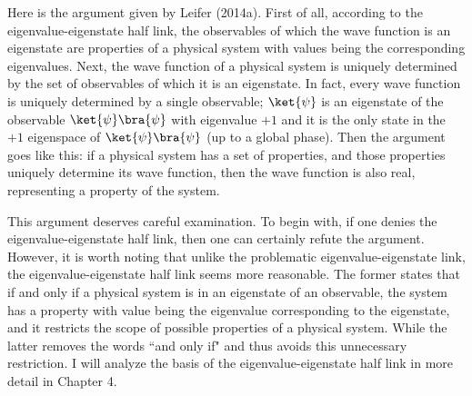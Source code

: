Here is the argument given by Leifer (2014a). First of all, according to the eigenvalue-eigenstate half link, the observables of which the wave function is an eigenstate are properties of a physical system with values being the corresponding eigenvalues. Next, the wave function of a physical system is uniquely determined by the set of observables of which it is an eigenstate. In fact, every wave function is uniquely determined by a single observable; $\ket{\psi}$ is an eigenstate of the observable $\ket{\psi}\bra{\psi}$ with eigenvalue $+1$ and it is the only state in the $+1$ eigenspace of $\ket{\psi}\bra{\psi}$ (up to a global phase). Then the argument goes like this: if a physical system has a set of properties, and those properties uniquely determine its wave function, then the wave function is also real, representing a property of the system.

This argument deserves careful examination. 
To begin with, if one denies the eigenvalue-eigenstate half link, then one can certainly refute the argument.
However, it is worth noting that unlike the problematic eigenvalue-eigenstate link, the eigenvalue-eigenstate half link seems more reasonable.
The former states that if and only if a physical system is in an eigenstate of an observable, the system has a property with value being the eigenvalue corresponding to the eigenstate, and it restricts the scope of possible  properties of a physical system. While the latter removes the words ``and only if" and thus avoids this unnecessary restriction. 
I will analyze the basis of the eigenvalue-eigenstate half link in more detail in Chapter 4.


